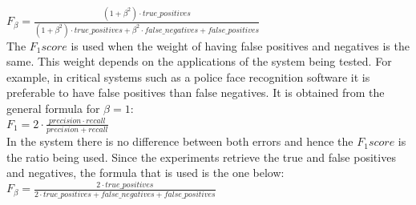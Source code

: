 		$F_\beta=\frac{(1+\beta^2)\cdot true\_positives}{(1+\beta^2)\cdot true\_positives +\beta^2 \cdot false\_negatives +false\_positives}$
		\\

		The $F_1 score$ is used when the weight of having false positives and negatives is the same. 
		This weight depends on the applications of the system being tested. 
		For example, in critical systems such as a police face recognition software it is preferable to have false positives than false negatives. 
		It is obtained from the general formula for $\beta=1$: 	
		\\

		$F_1=2\cdot\frac{precision \cdot recall}{precision + recall}$
		\\

		In the system there is no difference between both errors and hence the $F_1 score$ is the ratio being used. 
		Since the experiments retrieve the true and false positives and negatives, the formula that is used is the one below: 
		\\


		$F_\beta=\frac{2\cdot true\_positives}{2\cdot true\_positives + false\_negatives +false\_positives}$
		\\

